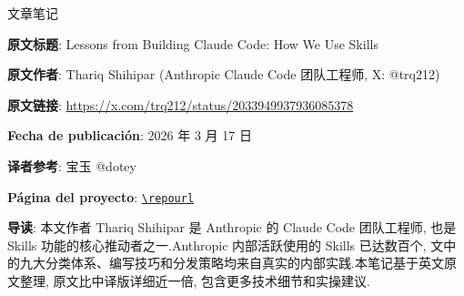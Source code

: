 
\begin{titlepage}
\centering
{\Large 文章笔记\par}
\vspace{1.2cm}
{\huge\bfseries \notetitle\par}
\vspace{0.8cm}
{\large \noteauthors\par}
\vspace{0.3cm}
{\large \notedate\par}
\vspace{1.5cm}

\begin{tcolorbox}[width=0.9\textwidth, colback=black!2!white, colframe=black!60, sharp corners]
\textbf{原文标题}: Lessons from Building Claude Code: How We Use Skills\par
\textbf{原文作者}: Thariq Shihipar (Anthropic Claude Code 团队工程师, X: @trq212)\par
\textbf{原文链接}: \href{https://x.com/trq212/status/2033949937936085378}{https://x.com/trq212/status/2033949937936085378}\par
\textbf{Fecha de publicación}: 2026 年 3 月 17 日\par
\textbf{译者参考}: 宝玉 @dotey\par
\textbf{Página del proyecto}: \href{\repourl}{\nolinkurl{\repourl}}\par
\end{tcolorbox}

\vspace{1cm}

\begin{tcolorbox}[width=0.9\textwidth, colback=blue!3!white, colframe=blue!60, sharp corners]
\textbf{导读}: 本文作者 Thariq Shihipar 是 Anthropic 的 Claude Code 团队工程师, 也是 Skills 功能的核心推动者之一.Anthropic 内部活跃使用的 Skills 已达数百个, 文中的九大分类体系、编写技巧和分发策略均来自真实的内部实践.本笔记基于英文原文整理, 原文比中译版详细近一倍, 包含更多技术细节和实操建议.
\end{tcolorbox}

\vfill
\end{titlepage}

\tableofcontents
\newpage


